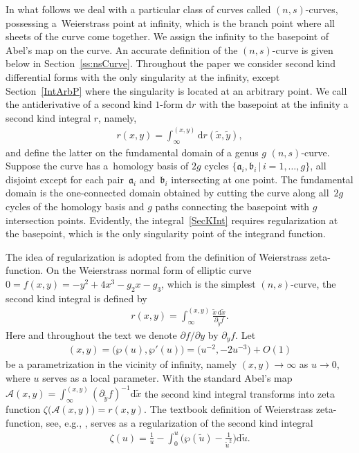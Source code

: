 \documentclass[11pt]{article}
\numberwithin{equation}{section}
\newcommand{\rmd}{\mathrm{d}}
\begin{document}
In what follows we deal with a particular class of curves called $(n,s)$-curves, possessing a~Weierstrass point at infinity, which is the branch point where all sheets of the curve come together. We assign the infinity to the basepoint of Abel's map on the curve. An accurate definition of the $(n,s)$-curve is given below in Section~\ref{ss:nsCurve}. Throughout the paper we consider second kind differential forms with the only singularity at the infinity, except Section~\ref{IntArbP} where the singularity is located at an arbitrary point. We call the antiderivative of a second kind $1$-form $\rmd r$ with the basepoint at the infinity a second kind integral $r$, namely,
\begin{gather}\label{SecKInt}
 r(x,y) = \int_{\infty}^{(x,y)} \rmd r(\tilde{x},\tilde{y}),
\end{gather}
and define the latter on the fundamental domain of a genus $g$ $(n,s)$-curve. Suppose the curve has a~homology basis of $2g$ cycles $\{\mathfrak{a}_i, \mathfrak{b}_i \,|\, i=1,\dots,g\}$, all disjoint except for each pair~$\mathfrak{a}_i$ and~$\mathfrak{b}_i$ intersecting at one point. The fundamental domain is the one-connected domain obtained by cutting the curve along all~$2g$ cycles of the homology basis and $g$ paths connecting the basepoint with $g$ intersection points. Evidently, the integral~\eqref{SecKInt} requires regularization at the basepoint, which is the only singularity point of the integrand function.

The idea of regularization is adopted from the definition of Weierstrass zeta-function. On the Weierstrass normal form of elliptic curve $0=f(x,y)=-y^2 + 4x^3 - g_2 x - g_3$, which is the simplest $(n,s)$-curve, the second kind integral is defined by
\begin{gather*}
 r(x,y) = \int_{\infty}^{(x,y)} \frac{\tilde{x}\, \rmd \tilde{x}}{\partial_{\tilde{y}} f}.
\end{gather*}
Here and throughout the text we denote $\partial f/\partial y$ by $\partial_y f$. Let
\begin{gather*} (x,y)=\big(\wp(u),\wp'(u)\big)= \big(u^{-2},{-}2u^{-3}\big)+O(1)\end{gather*} be a parametrization in the vicinity of infinity, namely $(x,y)\to\infty$ as $u\to 0$, where $u$ serves as a local parameter. With the standard Abel's map $\mathcal{A}(x,y) = \int_{\infty}^{(x,y)} (\partial_{\tilde{y}} f)^{-1}\rmd \tilde{x}$ the second kind integral transforms into zeta function $\zeta \big(\mathcal{A}(x,y)\big) = r(x,y)$. The textbook definition of Weierstrass zeta-function, see, e.g., \cite[Chapter~XX, Section~20.4]{Whittaker}, serves as a regularization of the second kind integral
\begin{gather*}
 \zeta(u) = \frac{1}{u} - \int_{0}^{u} \bigg(\wp(\tilde{u}) - \frac{1}{\tilde{u}^2}\bigg) \rmd \tilde{u}.
\end{gather*}
\end{document}
